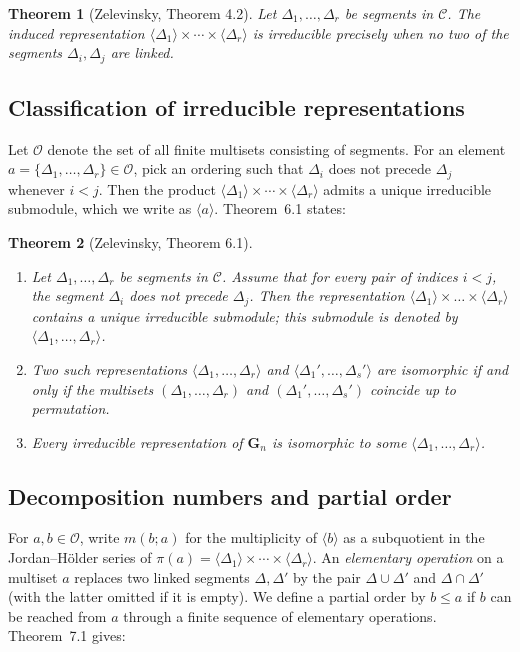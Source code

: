 \documentclass[12pt]{article}
\newtheorem{theorem}{Theorem}[section]
\theoremstyle{remark}
\begin{document}
\begin{theorem}[Zelevinsky, Theorem 4.2]
Let $\Delta_1,\dots,\Delta_r$ be segments in $\mathcal{C}$. The induced representation $\langle\Delta_1\rangle\times\cdots\times\langle\Delta_r\rangle$ is irreducible precisely when no two of the segments $\Delta_i,\Delta_j$ are linked.
\end{theorem}

\subsection{Classification of irreducible representations}
Let $\mathcal{O}$ denote the set of all finite multisets consisting of segments. For an element $a = \{\Delta_1,\dots,\Delta_r\}\in\mathcal{O}$, pick an ordering such that $\Delta_i$ does not precede $\Delta_j$ whenever $i<j$. Then the product $\langle\Delta_1\rangle\times\cdots\times\langle\Delta_r\rangle$ admits a unique irreducible submodule, which we write as $\langle a\rangle$. Theorem~6.1 states:

\begin{theorem}[Zelevinsky, Theorem 6.1]
\begin{enumerate}
\item Let $\Delta_1,\ldots,\Delta_r$ be segments in $\mathcal{C}$. Assume that for every pair of indices $i<j$, the segment $\Delta_i$ does not precede $\Delta_j$. Then the representation $\langle\Delta_1\rangle\times\ldots\times\langle\Delta_r\rangle$ contains a unique irreducible submodule; this submodule is denoted by $\langle\Delta_1,\ldots,\Delta_r\rangle$.
\item Two such representations $\langle\Delta_1,\ldots,\Delta_r\rangle$ and $\langle\Delta_1',\ldots,\Delta_s'\rangle$ are isomorphic if and only if the multisets $(\Delta_1,\ldots,\Delta_r)$ and $(\Delta_1',\ldots,\Delta_s')$ coincide up to permutation.
\item Every irreducible representation of $\mathbf{G}_n$ is isomorphic to some $\langle\Delta_1,\ldots,\Delta_r\rangle$.
\end{enumerate}
\end{theorem}

\subsection{Decomposition numbers and partial order}
For $a,b\in\mathcal{O}$, write $m(b;a)$ for the multiplicity of $\langle b\rangle$ as a subquotient in the Jordan--H\"older series of $\pi(a)=\langle\Delta_1\rangle\times\cdots\times\langle\Delta_r\rangle$. An \emph{elementary operation} on a multiset $a$ replaces two linked segments $\Delta,\Delta'$ by the pair $\Delta\cup\Delta'$ and $\Delta\cap\Delta'$ (with the latter omitted if it is empty). We define a partial order by $b\le a$ if $b$ can be reached from $a$ through a finite sequence of elementary operations. Theorem~7.1 gives:
\end{document}
